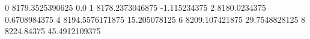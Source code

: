 0 8179.3525390625 0.0
1 8178.2373046875 -1.115234375
2 8180.0234375 0.6708984375
4 8194.5576171875 15.205078125
6 8209.107421875 29.7548828125
8 8224.84375 45.4912109375
